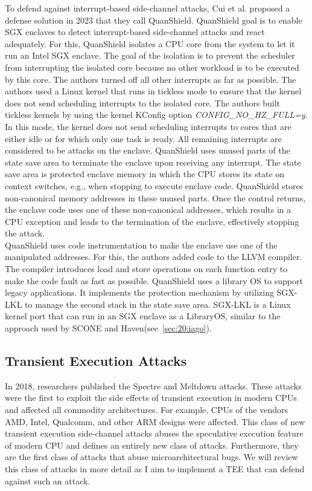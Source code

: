 To defend against interrupt-based side-channel attacks, Cui et al. proposed a
defense solution in 2023 that they call QuanShield.\cite{cui_quanshield_2023}
QuanShield goal is to enable SGX enclaves to detect interrupt-based side-channel
attacks and react adequately. For this, QuanShield isolates a CPU core from the
system to let it run an Intel SGX enclave. The goal of the isolation is to
prevent the scheduler from interrupting the isolated core because no other
workload is to be executed by this core. The authors turned off all other
interrupts as far as possible. The authors used a Linux kernel that runs in
tickless mode to ensure that the kernel does not send scheduling interrupts to
the isolated core. The authors built tickless kernels by using the kernel
KConfig option \textit{CONFIG\_NO\_HZ\_FULL=y}. In this mode, the kernel does
not send scheduling interrupts to cores that are either idle or for which only
one task is ready.\cite{linuxtickless} All remaining interrupts are considered
to be attacks on the enclave. QuanShield uses unused parts of the state save
area to terminate the enclave upon receiving any interrupt. The state save area
is protected enclave memory in which the CPU stores its state on context
switches, e.g., when stopping to execute enclave code. QuanShield stores
non-canonical memory addresses in these unused parts. Once the control returns,
the enclave code uses one of these non-canonical addresses, which results in a
CPU exception and leads to the termination of the enclave, effectively stopping
the attack.\\

QuanShield uses code instrumentation to make the enclave use one of the
manipulated addresses. For this, the authors added code to the LLVM compiler.
The compiler introduces load and store operations on each function entry to make
the code fault as fast as possible. QuanShield uses a library OS to support
legacy applications. It implements the protection mechanism by utilizing SGX-LKL
to manage the second stack in the state save area. SGX-LKL is a Linux kernel
port that can run in an SGX enclave as a LibraryOS, similar to the approach used
by SCONE and Haven(see~\ref{sec:20:iago}).\cite{priebe2019sgx}

\subsection{Transient Execution Attacks}
\label{sec:20:transientattacks}
In 2018, researchers published the Spectre and Meltdown
attacks.\cite{kocher_spectre_2020, lipp_meltdown_2020} These attacks were the
first to exploit the side effects of transient execution in modern CPUs and
affected all commodity architectures. For example, CPUs of the vendors AMD,
Intel, Qualcomm, and other ARM designs were affected. This class of new
transient execution side-channel attacks abuses the speculative execution
feature of modern CPU and defines an entirely new class of attacks. Furthermore,
they are the first class of attacks that abuse microarchitectural bugs. We will
review this class of attacks in more detail as I aim to implement a TEE that
can defend against such an attack.\\

